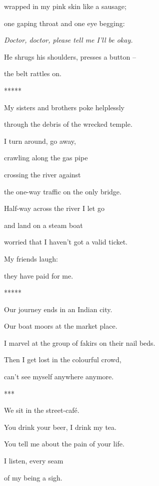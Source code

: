 wrapped in my pink skin like a sausage;

one gaping throat and one eye begging:

\emph{
Doctor, doctor, please tell me I'll be okay.}

He shrugs his shoulders, presses a button -- 

the belt rattles on.


\bigskip


\bigskip

*****


\bigskip

My sisters and brothers poke helplessly

through the debris of the wrecked temple.

I turn around, go away, 

crawling along the gas pipe 

crossing the river against 

the one-way traffic on the only bridge.


\bigskip

Half-way across the river I let go

and land on a steam boat

worried that I haven't got a valid ticket.

My friends laugh:

they have paid for me.


\bigskip


\bigskip

*****


\bigskip

Our journey ends in an Indian city.

Our boat moors at the market place.

I marvel at the group of fakirs on their nail beds.

Then I get lost in the colourful crowd,

can't see myself anywhere anymore.


\bigskip


\bigskip

***


\bigskip

We sit in the street-café.

You drink your beer, I drink my tea.

You tell me about the pain of your life.

I listen, every seam 

of my being a sigh.


